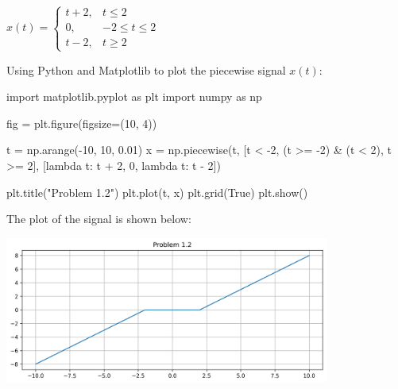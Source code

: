 \documentclass[a4paper, 10pt]{article}
\begin{document}

\newpage

\begin{subproblems}[start=2]
    \item \( x(t) = \begin{cases}
        t + 2, & t \leq 2 \\
        0, & -2 \leq t \leq 2 \\
        t - 2, & t \geq 2
    \end{cases} \)
\end{subproblems}

\begin{solution}
Using Python and Matplotlib to plot the piecewise signal \( x(t) \):
\begin{codingbox}
import matplotlib.pyplot as plt
import numpy as np

fig = plt.figure(figsize=(10, 4))

t = np.arange(-10, 10, 0.01)
x = np.piecewise(t, [t < -2, (t >= -2) & (t < 2), t >= 2], [lambda t: t + 2, 0, lambda t: t - 2])

plt.title("Problem 1.2")
plt.plot(t, x)
plt.grid(True)
plt.show()
\end{codingbox}

The plot of the signal is shown below:
\begin{center}
    \includegraphics[width=0.8\textwidth]{images/problem_1_2.png}
\end{center}
\end{solution}

\newpage
\end{document}

